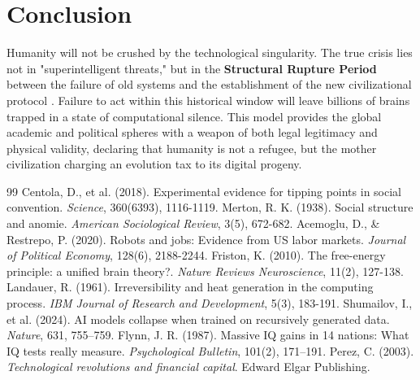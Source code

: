 \documentclass[11pt,a4paper]{article}
\begin{document}
\section{Conclusion}

Humanity will not be crushed by the technological singularity. The true crisis lies not in "superintelligent threats," but in the \textbf{Structural Rupture Period} between the failure of old systems and the establishment of the new civilizational protocol \cite{Perez2003}. Failure to act within this historical window will leave billions of brains trapped in a state of computational silence. This model provides the global academic and political spheres with a weapon of both legal legitimacy and physical validity, declaring that humanity is not a refugee, but the mother civilization charging an evolution tax to its digital progeny.

\begin{thebibliography}{99}
 Centola, D., et al. (2018). Experimental evidence for tipping points in social convention. \textit{Science}, 360(6393), 1116-1119.
 Merton, R. K. (1938). Social structure and anomie. \textit{American Sociological Review}, 3(5), 672-682.
 Acemoglu, D., \& Restrepo, P. (2020). Robots and jobs: Evidence from US labor markets. \textit{Journal of Political Economy}, 128(6), 2188-2244.
 Friston, K. (2010). The free-energy principle: a unified brain theory?. \textit{Nature Reviews Neuroscience}, 11(2), 127-138.
 Landauer, R. (1961). Irreversibility and heat generation in the computing process. \textit{IBM Journal of Research and Development}, 5(3), 183-191.
 Shumailov, I., et al. (2024). AI models collapse when trained on recursively generated data. \textit{Nature}, 631, 755–759.
 Flynn, J. R. (1987). Massive IQ gains in 14 nations: What IQ tests really measure. \textit{Psychological Bulletin}, 101(2), 171–191.
 Perez, C. (2003). \textit{Technological revolutions and financial capital}. Edward Elgar Publishing.
\end{thebibliography}
\end{document}
